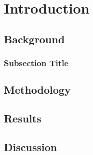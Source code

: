 \chapter{Introduction}\label{ch:introduction}
\lipsum[1-2] %

\section{Background}
\lipsum[3-4] %
\cite{sample2023}
\cite{samplebook2023}
\cite{sampleconference2023}

\subsection{Subsection Title}
\lipsum[5] %

\section{Methodology}
\lipsum[6-7] %

\section{Results}
\lipsum[8-9] %

\section{Discussion}
\lipsum[10] %
